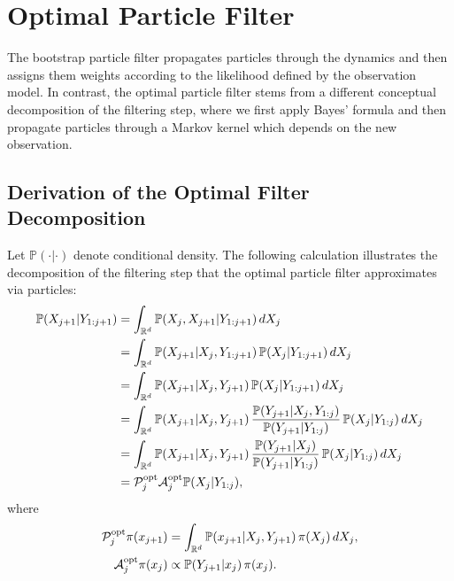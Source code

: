 
\section{Optimal Particle Filter}
\label{sec:9.3}

The bootstrap particle filter propagates particles through the dynamics and then assigns
them weights according to the likelihood defined by the observation model. In contrast,
the optimal particle filter stems from a different conceptual decomposition of the
filtering step, where we first apply Bayes' formula and then propagate particles through a
Markov kernel which depends on the new observation.

\subsection{Derivation of the Optimal Filter Decomposition}
\label{sec:9.3.1}

Let $\mathbb{P}(\cdot|\cdot)$ denote conditional density. The following calculation
illustrates the decomposition of the filtering step that the optimal particle filter
approximates via particles:
\begin{align*}
  \mathbb{P}(X_{j+1} | Y_{1:j+1})
  &= \int_{\mathbb{R}^d} \mathbb{P}(X_j, X_{j+1} | Y_{1:j+1})\,dX_j \\
  &= \int_{\mathbb{R}^d} \mathbb{P}(X_{j+1} | X_j, Y_{1:j+1})\,\mathbb{P}(X_j | Y_{1:j+1})\,dX_j \\
  &= \int_{\mathbb{R}^d} \mathbb{P}(X_{j+1} | X_j, Y_{j+1})\,\mathbb{P}(X_j | Y_{1:j+1})\,dX_j \\
  &= \int_{\mathbb{R}^d} \mathbb{P}(X_{j+1} | X_j, Y_{j+1})\,
       \frac{\mathbb{P}(Y_{j+1} | X_j, Y_{1:j})}{\mathbb{P}(Y_{j+1} | Y_{1:j})}\,
       \mathbb{P}(X_j | Y_{1:j})\,dX_j \\
  &= \int_{\mathbb{R}^d} \mathbb{P}(X_{j+1} | X_j, Y_{j+1})\,
       \frac{\mathbb{P}(Y_{j+1} | X_j)}{\mathbb{P}(Y_{j+1} | Y_{1:j})}\,
       \mathbb{P}(X_j | Y_{1:j})\,dX_j \\
  &= \mathcal{P}_j^{\mathrm{opt}} \mathcal{A}_j^{\mathrm{opt}} \mathbb{P}(X_j | Y_{1:j}),
\end{align*}
where
\begin{align*}
  \mathcal{P}_j^{\mathrm{opt}} \pi(x_{j+1})
    &= \int_{\mathbb{R}^d} \mathbb{P}(x_{j+1} | X_j, Y_{j+1})\,\pi(X_j)\,dX_j, \\
  \mathcal{A}_j^{\mathrm{opt}} \pi(x_j)
    &\propto \mathbb{P}(Y_{j+1} | x_j)\,\pi(x_j).
\end{align*}

